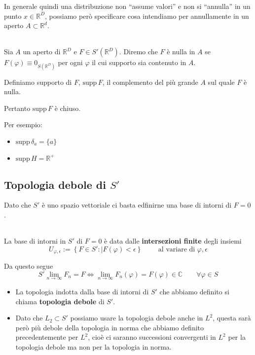 \documentclass[11pt,a4paper,twoside]{book}
\newenvironment{definizione}[1][\empty]{\begin{Definizione}{
\ifx\empty#1\relax\else\mdseries\itshape#1\\\fi
}{}}{\end{Definizione}}
\theoremstyle{esss}
\theoremstyle{dotless}
\numberwithin{equation}{section} %
\begin{document}
In generale quindi una distribuzione non ``assume valori'' e non si ``annulla'' in un punto $x\in\mathbb{R}^D$, possiamo però specificare cosa intendiamo per annullamente in un aperto $A\subset\mathbb{R}^d$.
\begin{definizione}
Sia $A$ un aperto di $\mathbb{R}^D$ e $F\in S'(\mathbb{R}^D)$. Diremo che $F$ è nulla in $A$ se $F(\varphi)\equiv 0_{S(\mathbb{R}^D)}$ per ogni $\varphi$ il cui supporto sia contenuto in $A$.

Definiamo supporto di $F$, $\text{supp}\,F$, il complemento del più grande $A$ sul quale $F$ è nulla.
\end{definizione}
Pertanto $\text{supp}\,F$ è chiuso.

Per esempio:
\begin{itemize}[label=$\cdot$]
\item $\text{supp}\,\delta_a=\{a\}$
\item $\text{supp}\,H=\mathbb{R}^+$
\end{itemize} 

\subsection{Topologia debole di $S'$}

Dato che $S'$ è uno spazio vettoriale ci basta edfinirne una base di intorni di $F=0$. 
\begin{definizione}
La base di intorni in $S'$ di $F=0$ è data dalle \textbf{intersezioni finite} degli insiemi
\[
U_{\varphi,\epsilon}:=\left\{F\in S' : |F(\varphi)<\epsilon\right\} \qquad \text{ al variare di }\varphi,\epsilon
\]
\end{definizione}

Da questo segue
\begin{equation}
S'\lim_{n\rightarrow\infty}F_n=F\iff\lim_{n\rightarrow\infty}F_n(\varphi)=F(\varphi)\in\mathbb{C} \qquad \forall\varphi\in S
\end{equation}

\begin{itemize}[label=$\cdot$]
\item La topologia indotta dalla base di intorni di $S'$ che abbiamo definito si chiama \textbf{topologia debole} di $S'$.
\item Dato che $L_2\subset S'$ possiamo usare la topologia debole anche in $L^2$, questa sarà però più debole della topologia in norma che abbiamo definito precedentemente per $L^2$, cioè ci saranno successioni convergenti in $L^2$ per la topologia debole ma non per la topologia in norma.
\end{itemize}
\end{document}

